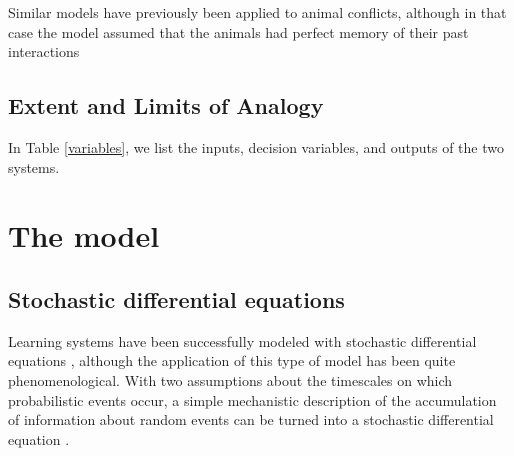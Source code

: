 \documentclass{article}
\begin{document}
Similar models have previously been applied to animal conflicts, although in that case the model assumed that the animals had perfect memory of their past interactions \citep{Froment:2010fk}

\subsection{Extent and Limits of Analogy }

In Table \ref{variables}, we list the inputs, decision variables, and outputs of the two systems.  



\section{The model \label{derivation}}
\subsection{Stochastic differential equations }
Learning systems have been successfully modeled with stochastic differential equations \citep{Eckhoff:2008uq, Brown:2005fk,Feng:2009kl,Bogacz:2006uq}, although the application of this type of model has been quite phenomenological.  With two assumptions about the timescales on which probabilistic events occur, a simple mechanistic description of the accumulation of information about random events can be turned into a stochastic differential equation \cite{Gillespie:2000fk}.  

\end{document}
